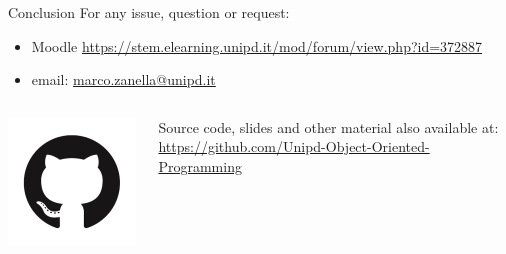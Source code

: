 \documentclass[11pt]{beamer}
\begin{document}
\begin{frame}{Conclusion}
 For any issue, question or request:
 \begin{itemize}
  \item Moodle \url{https://stem.elearning.unipd.it/mod/forum/view.php?id=372887}
  \item email: \href{mailto:marco.zanella@unipd.it}{marco.zanella@unipd.it}
 \end{itemize}
 
 \begin{columns}
  \begin{column}{0.15\textwidth}
   \includegraphics[width=0.99\textwidth]{assets/logo-github}
  \end{column}
  \begin{column}{0.85\textwidth}
   Source code, slides and other material also available at:
   \url{https://github.com/Unipd-Object-Oriented-Programming}
  \end{column}
 \end{columns}
\end{frame}
\end{document}
